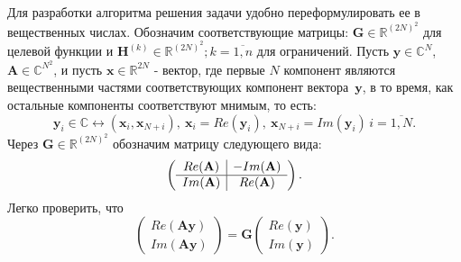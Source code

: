 Для разработки алгоритма решения задачи удобно переформулировать ее в вещественных числах. Обозначим соответствующие матрицы: $\textbf{G} \in \mathbb{R}^{(2N)^2}$ для целевой функции и $\textbf{H}^{(k)} \in \mathbb{R}^{(2N)^2}; k = \overline{1,n}$ для ограничений. Пусть $\textbf{y} \in \mathbb{C}^N$, $\textbf{A} \in \mathbb{C}^{N^2}$, и пусть $\textbf {x} \in \mathbb{R}^{2N}$ - вектор, где первые $N$
компонент являются вещественными частями соответствующих компонент вектора~$\textbf{y}$, в то время, как остальные компоненты соответствуют мнимым, то есть:
%
    $$
    \textbf{y}_i \in \mathbb{C} \longleftrightarrow (\textbf{x}_i,
    \textbf{x}_{N+i}), \ \textbf{x}_i = Re(\textbf{y}_i), \
    \textbf{x}_{N+i} = Im(\textbf{y}_i) \, i = \overline{1,N}.
    $$
%
Через $\textbf{G} \in \mathbb{R}^{(2N)^2}$ обозначим матрицу следующего вида:
%
    \begin{equation}
        \left( \begin{array}{c | c}
            Re(\textbf{A})& -Im(\textbf{A})\\
            \hline
            Im(\textbf{A})& Re(\textbf{A})\end{array}
        \right) .
    \end{equation}
%
Легко проверить, что
    \begin{equation}
        \left(\begin{array}{c} Re(\textbf{Ay}) \\ Im(\textbf{Ay})\end{array} \right) =
        \textbf{G}\left(\begin{array}{c} Re(\textbf{y}) \\ Im(\textbf{y})\end{array}\right) .
    \end{equation}
%

